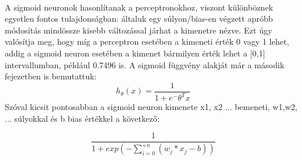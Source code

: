 \paragraph{}
A sigmoid neuronok hasonlítanak a perceptronokhoz, viszont különböznek egyetlen fontos tulajdonságban: általuk egy súlyon/bias-en végzett apróbb módosítás mindössze kisebb változással járhat a kimenetre nézve. Ezt úgy valósítja meg, hogy míg a perceptron esetében a kimeneti érték 0 vagy 1 lehet, addig a sigmoid neuron esetében a kimenet bármilyen érték lehet a [0,1] intervallumban, például 0.7496 is. A sigmoid függvény alakját már a második fejezetben is bemutattuk:
$$h_ \theta (x) =  \frac{\mathrm{1} }{\mathrm{1} + e^- \theta^Tx }  $$ 
Szóval kicsit pontosabban a sigmoid neuron kimenete x1, x2 ... bemeneti, w1,w2, ... súlyokkal és b bias értékkel a következő:

$$\frac{\mathrm{1} }{\mathrm{1} + exp(-\sum_{i=0}^{+n} (w_j * x_j - b)) }  $$ 